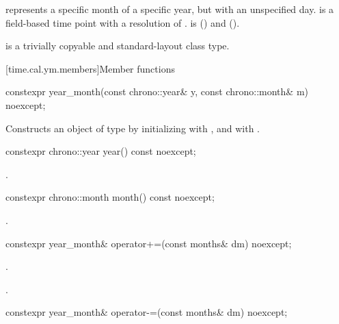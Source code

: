 \pnum
{} represents a specific month of a specific year,
but with an unspecified day.
 is a field-based time point with a resolution of .
 is  ()
and  ().

\pnum
{} is a trivially copyable and standard-layout class type.

[time.cal.ym.members]{Member functions}

%
\begin{itemdecl}
constexpr year_month(const chrono::year& y, const chrono::month& m) noexcept;
\end{itemdecl}

\begin{itemdescr}
\pnum
\effects
Constructs an object of type  by
initializing  with , and  with .
\end{itemdescr}

%
\begin{itemdecl}
constexpr chrono::year year() const noexcept;
\end{itemdecl}

\begin{itemdescr}
\pnum
\returns
{}.
\end{itemdescr}

%
\begin{itemdecl}
constexpr chrono::month month() const noexcept;
\end{itemdecl}

\begin{itemdescr}
\pnum
\returns
{}.
\end{itemdescr}

%
\begin{itemdecl}
constexpr year_month& operator+=(const months& dm) noexcept;
\end{itemdecl}

\begin{itemdescr}
\pnum
\effects
{}.

\pnum
\returns
{}.
\end{itemdescr}

%
\begin{itemdecl}
constexpr year_month& operator-=(const months& dm) noexcept;
\end{itemdecl}

